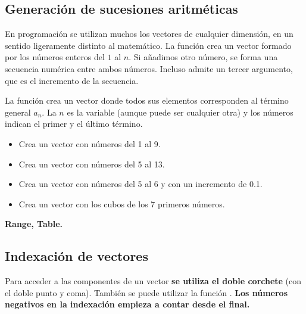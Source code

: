 \documentclass[a4paper,10pt, draft]{article}
\newcommand{\com}[1]{\textbf{\color{blue}{#1}}}
\newenvironment{ejer}{\begin{tcolorbox}[center title, title=Ejercicios,
fonttitle=\sffamily\bfseries,colback=blue!5,colframe=orange]}{\end{tcolorbox}}
\newenvironment{funciones}{\begin{tcolorbox}[center title, title=Nuevas funciones, fonttitle=\sffamily\bfseries, colback=green!5!white,colframe=red!75!black]}{\end{tcolorbox}\bigskip}
\begin{document}
\subsection{Generación de sucesiones aritméticas}

En programación se utilizan muchos los vectores de cualquier dimensión, en un sentido ligeramente distinto al matemático. La función \com{Range[n]} crea un vector formado por los números enteros del $1$ al $n$. Si añadimos otro número, se forma una secuencia numérica entre ambos números. Incluso admite un tercer argumento, que es el incremento de la secuencia.

La función \com{Table[a[n],\{n,nmin,nmx\}]} crea un vector donde todos sus elementos corresponden al término general $a_n$. La $n$ es la variable (aunque puede ser cualquier otra) y los números indican el primer y el último término.

\begin{ejer}

\begin{itemize}

\item Crea un vector con números del 1 al 9.

\item Crea un vector con números del 5 al 13.

\item Crea un vector con números del 5 al 6 y con un incremento de 0.1.

\item Crea un vector con los cubos de los 7 primeros números.

\end{itemize}


\end{ejer}  

\begin{funciones}

\textbf{Range, Table.}


\end{funciones}




 \newpage

\subsection{Indexación de vectores}

Para acceder a las componentes de un vector \textbf{se utiliza el doble corchete} (con el doble punto y coma). También se puede utilizar la función \com{Part[v,i;;j]}. \textbf{Los números negativos en la indexación empieza a contar desde el final.}
\end{document}

